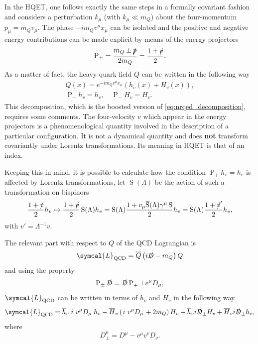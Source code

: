 In the HQET, one follows exactly the same steps in a formally covariant fashion and considers a perturbation $k_\mu$ (with $k_\mu \ll m_Q$) about the four-momentum $p_\mu = m_Q v_\mu$. The phase $-i m_Q v^\mu x_\mu$ can be isolated and the positive and negative energy contributions can be made explicit by means of the energy projectors
\begin{equation}
  \operatorname{P}_\pm = \frac{m_Q \pm \slashed{p}}{2 m_Q} = \frac{1 \pm \slashed{v}}{2} .
\end{equation}
As a matter of fact, the heavy quark field $Q$ can be written in the following way
\begin{gather}
  Q(x) = e^{-i m_Q v^\mu x_\mu} \left( h_v(x) + H_v(x) \right) , \\
  \operatorname{P}_+ h_v = h_v, \quad \operatorname{P}_- H_v = H_v .
\end{gather}
This decomposition, which is the boosted version of \eqref{eq:nrqed_decomposition}, requires some comments. The four-velocity $v$ which appear in the energy projectors is a phenomenological quantity involved in the description of a particular configuration. It is not a dynamical quantity and does \textbf{not} transform covariantly under Lorentz transformations. Its meaning in HQET is that of an index. 

Keeping this in mind, it is possible to calculate how the condition $\operatorname{P}_+ h_v = h_v$ is affected by Lorentz transformations, let $\operatorname{S}(\Lambda)$ be the action of such a transformation on bispinors
\begin{equation}
  \frac{1 + \slashed{v}}{2} h_v \mapsto \frac{1 + \slashed{v}}{2} \operatorname{S}(\Lambda) h_v = \operatorname{S}(\Lambda) \frac{1 + v_\mu \overline{\operatorname{S}}(\Lambda) \gamma^\mu \operatorname{S}}{2} h_v = \operatorname{S}(\Lambda) \frac{1 + \slashed{v}^\prime}{2} h_v , 
\end{equation}
with $v' = \Lambda^{-1} v$.

The relevant part with respect to $Q$ of the QCD Lagrangian is
\begin{equation}
  \symcal{L}_\text{QCD} = \adj{Q} \left( i \slashed{D} - m_Q \right) Q 
\end{equation}
and using the property
\begin{equation}
  \operatorname{P}_\pm \slashed{D} = \slashed{D} \operatorname{P}_\mp \pm v^\mu D_\mu ,
\end{equation}
$\symcal{L}_\text{QCD}$ can be written in terms of $h_v$ and $H_v$ in the following way
\begin{equation}
  \symcal{L}_\text{QCD} = \adj{h}_v \left. i \ v^\mu D_\mu \right. h_v - \adj{H}_v \left( \left. i \ v^\mu D_\mu \right. + 2 m_Q \right) H_v + \adj{h}_v i \slashed{D}_\perp H_v + \adj{H}_v i \slashed{D}_\perp h_v ,
\end{equation}
where
\begin{equation}
  D_\perp^\mu = D^\mu - v^\mu v^\nu D_\nu .
\end{equation}

